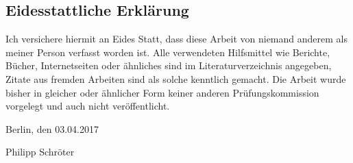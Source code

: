 %
\pagestyle{empty}

\subsection*{Eidesstattliche Erklärung}

Ich versichere hiermit an Eides Statt, dass diese Arbeit von niemand anderem als meiner Person verfasst worden ist. Alle verwendeten Hilfsmittel wie Berichte, Bücher, Internetseiten oder ähnliches sind im Literaturverzeichnis angegeben, Zitate aus fremden Arbeiten sind als solche kenntlich gemacht. Die Arbeit wurde bisher in gleicher oder ähnlicher Form keiner anderen Prüfungskommission vorgelegt und auch nicht veröffentlicht.
\par\bigskip  
\noindent Berlin, den 03.04.2017

\vspace{1.2cm}

\noindent Philipp Schröter

\cleardoublepage